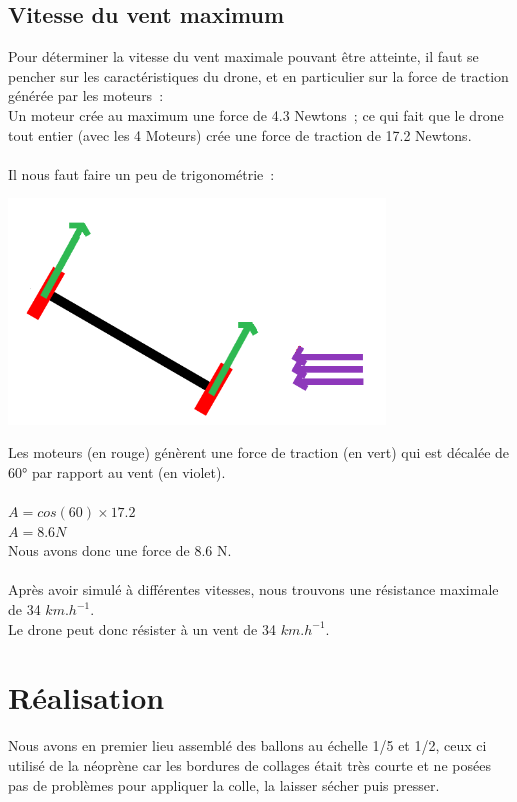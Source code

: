 \documentclass[a4paper,11pt]{article}
\begin{document}
\subsection{Vitesse du vent maximum}
Pour déterminer la vitesse du vent maximale pouvant être atteinte, il faut se pencher sur les caractéristiques du drone, et en particulier sur la force de traction générée par les moteurs~:\\
Un moteur crée au maximum une force de 4.3 Newtons~; ce qui fait que le drone tout entier (avec les 4 Moteurs) crée une force de traction de 17.2 Newtons.\\
\\
Il nous faut faire un peu de trigonométrie~:
\begin{center}
	\includegraphics[width=10cm]{../Images/vitesseVent.png}
\end{center}
Les moteurs (en rouge) génèrent une force de traction (en vert) qui est décalée de 60° par rapport au vent (en violet).\\
\\
$A = cos(60) \times 17.2$\\
$A = 8.6 N$\\
Nous avons donc une force de 8.6 N.\\
\\
Après avoir simulé à différentes vitesses, nous trouvons une résistance maximale de 34 $km.h^{-1}$.\\
Le drone peut donc résister à un vent de 34 $km.h^{-1}$.

\section{Réalisation}

Nous avons en premier lieu assemblé des ballons au échelle 1/5 et 1/2, ceux ci utilisé de la néoprène car les bordures de collages était très courte et ne posées pas de problèmes pour appliquer la colle, la laisser sécher puis presser.
\end{document}
